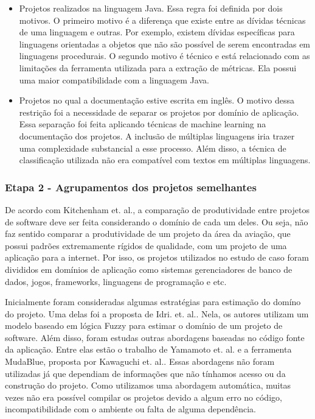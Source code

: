 \begin{itemize}
\item Projetos realizados na linguagem Java. Essa regra foi definida por dois motivos. O primeiro motivo é a diferença que existe entre as dívidas técnicas de uma linguagem e outras. Por exemplo, existem dívidas específicas para linguagens orientadas a objetos que não são possível de serem encontradas em linguagens procedurais. O segundo motivo é técnico e está relacionado com as limitações da ferramenta utilizada para a extração de métricas. Ela possui uma maior compatibilidade com a linguagem Java.
\item Projetos no qual a documentação estive escrita em inglês. O motivo dessa restrição foi a necessidade de separar os projetos por domínio de aplicação. Essa separação foi feita aplicando técnicas de machine learning  na documentação dos projetos.  A inclusão de múltiplas linguagens iria trazer uma complexidade substancial a esse processo. Além disso, a técnica de classificação utilizada não era compatível com textos em múltiplas linguagens.
\end{itemize}


\subsubsection{Etapa 2 - Agrupamentos dos projetos semelhantes}


De acordo com Kitchenham et. al.\cite{kitchenham2004software}, a comparação de produtividade entre projetos de software deve ser feita considerando o domínio de cada um deles. Ou seja, não faz sentido comparar a produtividade de um projeto da área da aviação, que possui padrões extremamente rígidos de qualidade, com um projeto de uma aplicação para a internet. Por isso, os projetos utilizados no estudo de caso foram divididos em domínios de aplicação como sistemas gerenciadores de banco de dados, jogos, frameworks, linguagens de programação e etc.

Inicialmente foram consideradas algumas estratégias para estimação do domíno do projeto. Uma delas foi a proposta de Idri. et. al.\cite{idri2001fuzzy}. Nela, os autores utilizam um modelo baseado em lógica Fuzzy para estimar o domínio de um projeto de software. Além disso, foram estudas outras abordagens baseadas no código fonte da aplicação. Entre elas estão o trabalho de Yamamoto et. al.\cite{yamamoto2005measuring} e a ferramenta MudaBlue, proposta por Kawaguchi et. al.\cite{kawaguchi2006mudablue}. Essas abordagens não foram utilizadas já que dependiam de informações que não tínhamos acesso ou da construção do projeto. Como utilizamos uma abordagem automática, muitas vezes não era possível compilar os projetos devido a algum erro no código, incompatibilidade com o ambiente ou falta de alguma dependência. 

